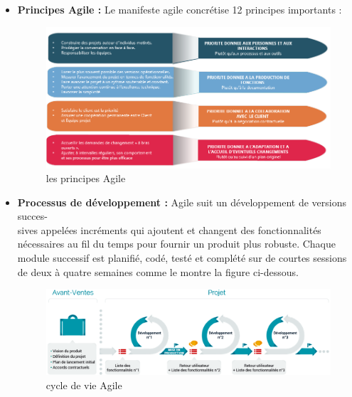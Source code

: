 \begin{itemize}[label=\textbullet,font=\normalsize]
\addtolength{\itemindent}{1cm}
\item \textbf{Principes Agile :}
Le manifeste agile concrétise 12 principes importants : 
\begin{figure}[H]
\centering
\includegraphics[width=1\columnwidth]{images/principes_agile.png}
\caption{les principes Agile}
\label{fig:les principes Agile}
\end{figure} 

\item \textbf{Processus de développement :}
Agile suit un développement de versions succes- \\ sives appelées incréments qui ajoutent et changent des fonctionnalités nécessaires au fil du temps pour fournir un produit plus robuste. Chaque module successif est planifié, codé, testé et complété sur de courtes sessions de deux à quatre semaines comme le montre la figure ci-dessous.
\begin{figure}[H]
\centering
\includegraphics[width=1\columnwidth]{images/processus_agile.png}
\caption{cycle de vie Agile}
\label{fig:Mod-Enseig}
\end{figure} 
\end{itemize}

